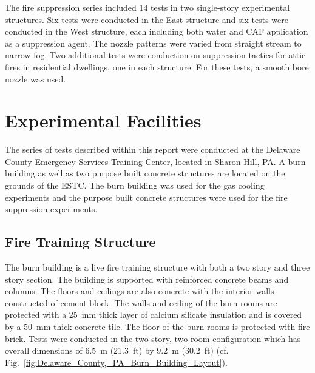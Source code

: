 \documentclass[12pt,oneside]{book}
\begin{document}
The fire suppression series included 14 tests in two single-story experimental structures. Six tests were conducted in the East structure and six tests were conducted in the West structure, each including both water and CAF application as a suppression agent. The nozzle patterns were varied from straight stream to narrow fog. Two additional tests were conduction on suppression tactics for attic fires in residential dwellings, one in each structure. For these tests, a smooth bore nozzle was used.

\section{Experimental Facilities}
\label{sec:Experimental_Facility}

The series of tests described within this report were conducted at the Delaware County Emergency Services Training Center, located in Sharon Hill, PA. A burn building as well as two purpose built concrete structures are located on the grounds of the ESTC. The burn building was used for the gas cooling experiments and the purpose built concrete structures were used for the fire suppression experiments.

\subsection{Fire Training Structure}
\label{sec:Burn_Building}

The burn building is a live fire training structure with both a two story and three story section. The building is supported with reinforced concrete beams and columns. The floors and ceilings are also concrete with the interior walls constructed of cement block. The walls and ceiling of the burn rooms are protected with a 25~mm thick layer of calcium silicate insulation and is covered by a 50~mm thick concrete tile. The floor of the burn rooms is protected with fire brick. Tests were conducted in the two-story, two-room configuration which has overall dimensions of 6.5~m (21.3~ft) by 9.2~m (30.2~ft) (cf. Fig.~\ref{fig:Delaware_County,_PA_Burn_Building_Layout}).
\end{document}
